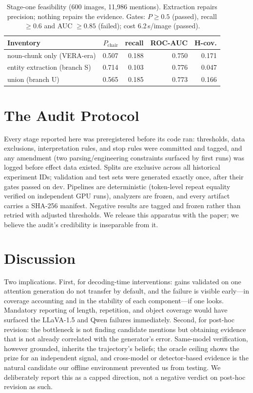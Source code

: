 \documentclass[11pt]{article}
\begin{document}
\begin{table}[t]
\centering\small
\begin{tabular}{lrrrr}
\toprule
Inventory & $P_{\text{chair}}$ & recall & ROC-AUC & H-cov. \\
\midrule
noun-chunk only (VERA-era) & 0.507 & 0.188 & 0.750 & 0.171 \\
entity extraction (branch S) & 0.714 & 0.103 & 0.776 & 0.047 \\
union (branch U) & 0.565 & 0.185 & 0.773 & 0.166 \\
\bottomrule
\end{tabular}
\caption{Stage-one feasibility (600 images, 11{,}986 mentions). Extraction repairs precision; nothing repairs the evidence. Gates: $P\ge0.5$ (passed), recall $\ge0.6$ and AUC $\ge0.85$ (failed); cost 6.2\,s/image (passed).}
\label{tab:stage1}
\end{table}

\section{The Audit Protocol}
\label{sec:protocol}
Every stage reported here was preregistered before its code ran: thresholds, data exclusions, interpretation rules, and stop rules were committed and tagged, and any amendment (two parsing/engineering constraints surfaced by first runs) was logged before effect data existed. Splits are exclusive across all historical experiment IDs; validation and test sets were generated exactly once, after their gates passed on dev. Pipelines are deterministic (token-level repeat equality verified on independent GPU runs), analyzers are frozen, and every artifact carries a SHA-256 manifest. Negative results are tagged and frozen rather than retried with adjusted thresholds. We release this apparatus with the paper; we believe the audit's credibility is inseparable from it.

\section{Discussion}
\label{sec:discussion}
Two implications. First, for decoding-time interventions: gains validated on one attention generation do not transfer by default, and the failure is visible early---in coverage accounting and in the stability of each component---if one looks. Mandatory reporting of length, repetition, and object coverage would have surfaced the LLaVA-1.5 and Qwen failures immediately. Second, for post-hoc revision: the bottleneck is not finding candidate mentions but obtaining evidence that is not already correlated with the generator's error. Same-model verification, however grounded, inherits the trajectory's beliefs; the oracle ceiling shows the prize for an independent signal, and cross-model or detector-based evidence is the natural candidate our offline environment prevented us from testing. We deliberately report this as a capped direction, not a negative verdict on post-hoc revision as such.
\end{document}
